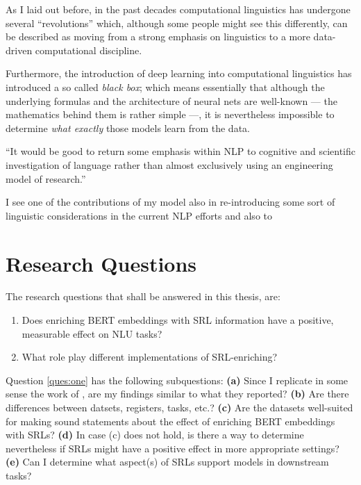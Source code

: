 {\color{red} As I laid out before, in the past decades computational linguistics has undergone several
``revolutions'' which, although some people might see this differently, can be described as
moving from a strong emphasis on linguistics to a more data-driven computational discipline.

Furthermore, the introduction of deep learning into computational linguistics has introduced a
so called \emph{black box}; which means essentially that although the underlying formulas and the
architecture of neural nets are well-known --- the mathematics behind them is rather simple ---,
it is nevertheless impossible to determine \emph{what exactly} those models learn from the data.

``It would be good to return some emphasis within NLP to
cognitive and scientific investigation of language rather than almost exclusively using
an engineering model of research.'' \citep[p.~706]{manning2015computational}


I see one of the contributions of my model also in re-introducing some sort of linguistic
considerations in the current NLP efforts and also to}




\section{Research Questions}

The research questions that shall be answered in this thesis, are:

\begin{enumerate}
  \item \label{ques:one} Does enriching BERT embeddings with SRL information have a positive,
                         measurable effect on NLU tasks?
  \item \label{ques:two} What role play different implementations of SRL-enriching?
\end{enumerate}

Question \ref{ques:one} has the following subquestions: \textbf{(a)} Since I replicate
in some sense the work of \cite{zhang2019semantics}, are my findings similar to what
they reported? \textbf{(b)} Are there differences between datsets, registers, tasks,
etc.? \textbf{(c)} Are the datasets well-suited for making sound statements about the
effect of enriching BERT embeddings with SRLs? \textbf{(d)} In case (c) does not hold,
is there a way to determine nevertheless if SRLs might have a positive effect in more
appropriate settings? \textbf{(e)} Can I determine what aspect(s) of SRLs support
models in downstream tasks?

